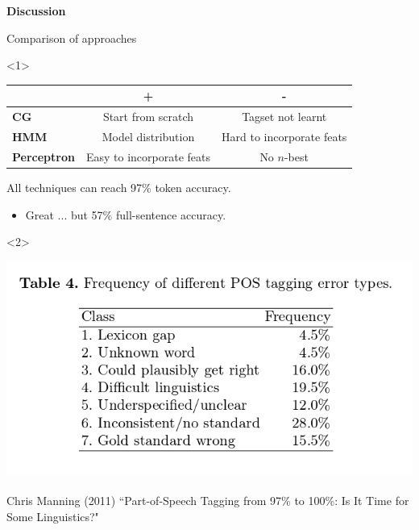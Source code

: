 \documentclass{beamer}
\begin{document}

\begin{frame}

\centering
{\LARGE {\bf Discussion} }

\end{frame}

\begin{frame}{Comparison of approaches}


\begin{onlyenv}<1>
\begin{center}
\begin{tabular}{|l|c|c|}
 \hline
   & {\Large \textbf{+}} & {\Large \textbf{-}}  \\
 \hline
\textbf{CG} & Start from scratch & Tagset not learnt \\
\textbf{HMM} & Model distribution & Hard to incorporate feats \\
\textbf{Perceptron} & Easy to incorporate feats & No $n$-best  \\
 \hline
\end{tabular}
\end{center}

All techniques can reach 97\% token accuracy.
\begin{itemize}
  \item Great ... but 57\% full-sentence accuracy.
\end{itemize}
\end{onlyenv}
\begin{onlyenv}<2>

\includegraphics[width=\textwidth]{images/manning-errors.png}
~\\
Chris Manning (2011) ``Part-of-Speech Tagging from 97\% to 100\%: Is It Time for Some Linguistics?"
\end{onlyenv}


\end{frame}
\end{document}
